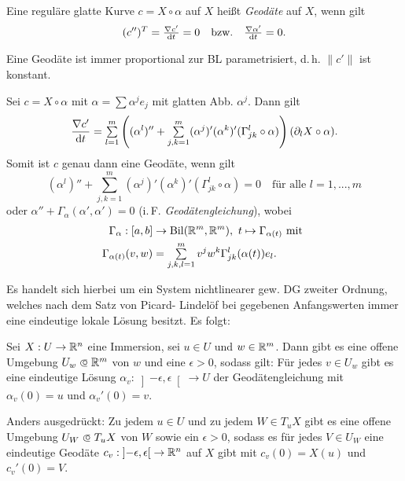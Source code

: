 \documentclass{cheat-sheet}
\newcommand{\Bil}{\mathrm{Bil}}
\newcommand{\ointervall}[1]{\left]#1\right[} %
\begin{document}
\begin{definition}
  Eine reguläre glatte Kurve $c = X \circ \alpha$ auf $X$ heißt \emph{Geodäte} auf $X$, wenn gilt
  \[ (c'')^T = \tfrac{\nabla c'}{\mathrm{d} t} = 0 \quad\text{bzw.}\quad \tfrac{\nabla \alpha'}{\mathrm{d} t} = 0. \]
\end{definition}

\begin{satz}
  Eine Geodäte ist immer proportional zur BL parametrisiert, d.\,h. $\|c'\|$ ist konstant.
\end{satz}

\begin{bem}
  Sei $c = X \circ \alpha$ mit $\alpha = \sum \alpha^j e_j$ mit glatten Abb. $\alpha^j$. Dann gilt
  \[ \frac{\nabla c'}{\d t} = \sum_{l=1}^m \left( (\alpha^l)'' + \sum_{j,k=1}^m (\alpha^j)' (\alpha^k)' (\Gamma_{jk}^l \circ \alpha) \right) (\partial_l X \circ \alpha). \]
  Somit ist $c$ genau dann eine Geodäte, wenn gilt
  \[ (\alpha^l)'' + \sum_{j,k=1}^m (\alpha^j)' (\alpha^k)' (\Gamma_{jk}^l \circ \alpha) = 0 \quad \text{für alle $l = 1, ..., m$} \]
  oder $\alpha'' + \Gamma_{\alpha}(\alpha', \alpha') = 0$ (i.\,F. \emph{Geodätengleichung}), wobei
  \begin{align*}
    \Gamma_{\alpha} : [a, b] &\to \Bil(\R^m, \R^m), \  t \mapsto \Gamma_{\alpha(t)} \text{ mit }\\
    \Gamma_{\alpha(t)}(v, w) &= \sum_{j,k,l=1}^m v^j w^k \Gamma_{jk}^l (\alpha(t)) e_l.
  \end{align*}
\end{bem}

\begin{bem}
  Es handelt sich hierbei um ein System nichtlinearer gew. DG zweiter Ordnung, welches nach dem Satz von Picard- Lindelöf bei gegebenen Anfangswerten immer eine eindeutige lokale Lösung besitzt. Es folgt:
\end{bem}

\begin{satz}
  Sei $X : U \to \mathbb{R}^n$ eine Immersion, sei $u \in U$ und $w \in \mathbb{R}^m$. Dann gibt es eine offene Umgebung $U_w \opn \R^m$ von $w$ und eine $\epsilon > 0$, sodass gilt: Für jedes $v \in U_w$ gibt es eine eindeutige Lösung $\alpha_v : \ointervall{-\epsilon, \epsilon} \to U$ der Geodätengleichung mit $\alpha_v(0) = u$ und $\alpha_v'(0) = v$.

  Anders ausgedrückt: Zu jedem $u \in U$ und zu jedem $W \in T_u X$ gibt es eine offene Umgebung $U_W \opn T_u X$ von $W$ sowie ein $\epsilon > 0$, sodass es für jedes $V \in U_W$ eine eindeutige Geodäte $c_v : \ointervall{-\epsilon, \epsilon} \to \R^n$ auf $X$ gibt mit $c_v(0) = X(u)$ und $c_v'(0) = V$.
\end{satz}
\end{document}
